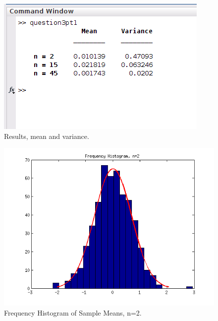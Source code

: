 \documentclass[12pt,a4paper]{article}
\begin{document}
\begin{figure}[ht!]
\begin{center}
\includegraphics[scale=.80]{q3pt1_table.png}
\caption{Results, mean and variance.}
\label{q3pt1fig2}
\end{center}
\end{figure}
\FloatBarrier


\begin{figure}[ht!]
\begin{center}
\includegraphics[scale=.70]{q3pt1_hist_2.png}
\caption{Frequency Histogram of Sample Means, n=2.}
\label{q3pt1fig3}
\end{center}
\end{figure}
\FloatBarrier
\end{document}
